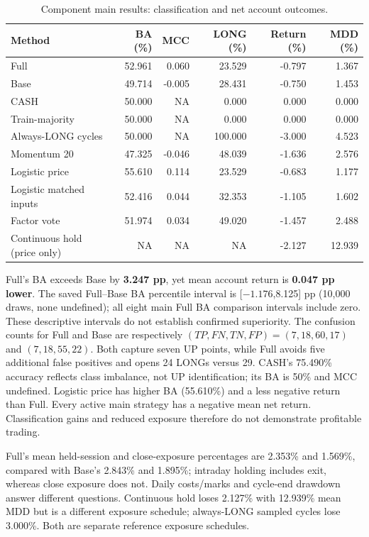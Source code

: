 \begin{table}[htbp]\centering\small{}\setlength{\tabcolsep}{4pt}
\caption[Component main results]{Component main results: classification and net account outcomes.}\label{tab:component}
\begin{tabular}{@{}P{.27\linewidth}rrrrr@{}}\toprule
Method & BA (\%) & MCC & LONG (\%) & Return (\%) & MDD (\%)\\\midrule
Full & 52.961 & 0.060 & 23.529 & -0.797 & 1.367\\
Base & 49.714 & -0.005 & 28.431 & -0.750 & 1.453\\
CASH & 50.000 & NA & 0.000 & 0.000 & 0.000\\
Train-majority & 50.000 & NA & 0.000 & 0.000 & 0.000\\
Always-LONG cycles & 50.000 & NA & 100.000 & -3.000 & 4.523\\
Momentum 20 & 47.325 & -0.046 & 48.039 & -1.636 & 2.576\\
Logistic price & 55.610 & 0.114 & 23.529 & -0.683 & 1.177\\
Logistic matched inputs & 52.416 & 0.044 & 32.353 & -1.105 & 1.602\\
Factor vote & 51.974 & 0.034 & 49.020 & -1.457 & 2.488\\
Continuous hold (price only) & NA & NA & NA & -2.127 & 12.939\\
\bottomrule\end{tabular}\end{table}

Full's BA exceeds Base by \textbf{3.247 pp}, yet mean account return is
\textbf{0.047 pp lower}. The saved Full--Base BA percentile interval is
[$-1.176$,8.125] pp (10,000 draws, none undefined); all eight main Full
BA comparison intervals include zero. These descriptive intervals do
not establish confirmed superiority. The confusion counts for Full and Base are respectively
$(TP,FN,TN,FP)=(7,18,60,17)$ and $(7,18,55,22)$. Both capture seven UP
points, while Full avoids five additional false positives and opens 24
LONGs versus 29. CASH's 75.490\% accuracy reflects class imbalance, not
UP identification; its BA is 50\% and MCC undefined. Logistic price has
higher BA (55.610\%) and a less negative return than Full. Every active
main strategy has a negative mean net return. Classification gains and
reduced exposure therefore do not demonstrate profitable trading.

Full's mean held-session and close-exposure percentages are 2.353\% and
1.569\%, compared with Base's 2.843\% and 1.895\%; intraday holding includes exit, whereas close exposure
does not. Daily costs/marks and cycle-end drawdown answer different
questions. Continuous hold loses 2.127\% with 12.939\% mean MDD but is a
different exposure schedule; always-LONG sampled cycles lose 3.000\%.
Both are separate reference exposure schedules.

